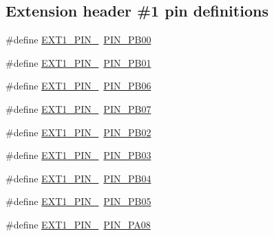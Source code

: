 \subsection*{Extension header \#1 pin definitions}
\begin{DoxyCompactItemize}
\item 
\#define \mbox{\hyperlink{group__samd21__xplained__pro__features__group_ga6ccee32105c9fafbb01770695b7f2b44}{E\+X\+T1\+\_\+\+P\+I\+N\+\_}}~\mbox{\hyperlink{pio_2samd21j18a_8h_aaee350eaf010d48a2c6efae0a1632f7c}{P\+I\+N\+\_\+\+P\+B00}}
\item 
\#define \mbox{\hyperlink{group__samd21__xplained__pro__features__group_ga5243ef88b70ab0ee20507c80ef8d7a0d}{E\+X\+T1\+\_\+\+P\+I\+N\+\_}}~\mbox{\hyperlink{pio_2samd21j18a_8h_aa599b1c1a8440ecffbf5fba215984c75}{P\+I\+N\+\_\+\+P\+B01}}
\item 
\#define \mbox{\hyperlink{group__samd21__xplained__pro__features__group_ga5ca695ea694bce97dfb20e52de5b4a15}{E\+X\+T1\+\_\+\+P\+I\+N\+\_}}~\mbox{\hyperlink{pio_2samd21j18a_8h_a342eea40b1bafb1afe71ff68854d9747}{P\+I\+N\+\_\+\+P\+B06}}
\item 
\#define \mbox{\hyperlink{group__samd21__xplained__pro__features__group_ga6c808d0df1d56c22b669269ba2a8ccce}{E\+X\+T1\+\_\+\+P\+I\+N\+\_}}~\mbox{\hyperlink{pio_2samd21j18a_8h_a381a8ad61ecb02a4d455cd92a5a5fb1e}{P\+I\+N\+\_\+\+P\+B07}}
\item 
\#define \mbox{\hyperlink{group__samd21__xplained__pro__features__group_gaf90fe93609fea05220738c06abaabf71}{E\+X\+T1\+\_\+\+P\+I\+N\+\_}}~\mbox{\hyperlink{pio_2samd21j18a_8h_a19ef30fcec1b8ad27ff954975a005850}{P\+I\+N\+\_\+\+P\+B02}}
\item 
\#define \mbox{\hyperlink{group__samd21__xplained__pro__features__group_ga4768b3de92f5776c206a4e3262f05c47}{E\+X\+T1\+\_\+\+P\+I\+N\+\_}}~\mbox{\hyperlink{pio_2samd21j18a_8h_ab8f19878aac1648cb688cfcf0eec3fb5}{P\+I\+N\+\_\+\+P\+B03}}
\item 
\#define \mbox{\hyperlink{group__samd21__xplained__pro__features__group_ga8c0f8b12c67dfecaac7bb4c45990fb57}{E\+X\+T1\+\_\+\+P\+I\+N\+\_}}~\mbox{\hyperlink{pio_2samd21j18a_8h_ab4f72feca4eed2b50fb246dc2d59241d}{P\+I\+N\+\_\+\+P\+B04}}
\item 
\#define \mbox{\hyperlink{group__samd21__xplained__pro__features__group_gad2c2d06f0f2761bcc4c4448a233061f9}{E\+X\+T1\+\_\+\+P\+I\+N\+\_}}~\mbox{\hyperlink{pio_2samd21j18a_8h_ae62ed501d1f5f6cdc6bf605742aeb778}{P\+I\+N\+\_\+\+P\+B05}}
\item 
\#define \mbox{\hyperlink{group__samd21__xplained__pro__features__group_gab0c46ea18840c81fc2257547f8af3c57}{E\+X\+T1\+\_\+\+P\+I\+N\+\_}}~\mbox{\hyperlink{pio_2samd21j18a_8h_a7dc08bf81d9967156de18aae2cb5fe46}{P\+I\+N\+\_\+\+P\+A08}}

\end{DoxyCompactItemize}
